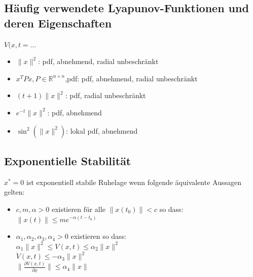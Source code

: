 \documentclass[german]{latex4ei/latex4ei_sheet}
\begin{document}
\begin{sectionbox}
\subsection{Häufig verwendete Lyapunov-Funktionen und deren Eigenschaften}
$V(x,t = \dots$
\begin{itemize}
  \item $\|x\|^2$: pdf, abnehmend, radial unbeschränkt
  \item $x^T P x, P \in \mathbb{R}^{n \times n}$,pdf: pdf, abnehmend, radial unbeschränkt
  \item $(t+1) \|x\|^2$: pdf, radial unbeschränkt
  \item $e^{-t}\|x\|^2$: pdf, abnehmend
  \item $\sin^2(\|x\|^2)$: lokal pdf, abnehmend
\end{itemize}

\subsection{Exponentielle Stabilität}
$x^* = 0$ ist exponentiell stabile Ruhelage wenn folgende äquivalente Aussagen gelten:
\begin{itemize}
  \item $c,m,\alpha > 0 $ existieren für alle $\|x(t_0)\| < c$ so dass: $\|x(t)\| \leq me^{-\alpha(t-t_0)}$
  \item $\alpha_1, \alpha_2, \alpha_3, \alpha_4 > 0$ existieren so dass:\\
    $\alpha_1 \|x\|^2 \leq V(x,t) \leq \alpha_2 \|x\|^2$ \\
    $\dot{V}(x,t) \leq - \alpha_3 \|x\|^2$ \\
    $\|\frac{\partial V(\underline{x},t)}{\partial \underline{x}}\| \leq \alpha_4 \|x\| $
\end{itemize}
\end{sectionbox}
\end{document}

